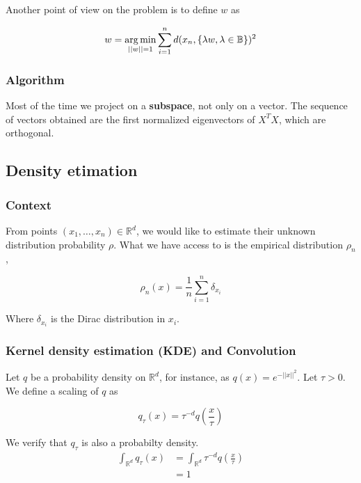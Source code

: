 \documentclass[
10pt, %
a4paper, %
oneside, %
headinclude,footinclude, %
BCOR5mm, %
]{scrartcl}
\begin{document}
Another point of view on the problem is to define $w$ as

\begin{equation*}
    w = \operatorname*{arg\,min}_{||w||=1} \sum^{n}_{i=1} d(x_n, \{\lambda w, \lambda\in \mathbb{B} \})^2
\end{equation*}

\subsubsection{\large\color{Periwinkle}Algorithm}

Most of the time we project on a \textbf{{subspace}}, not only on a vector. The sequence of vectors obtained are the first normalized eigenvectors of $X^TX$, which are orthogonal.

\subsection{\large\color{MidnightBlue}Density etimation}
\label{sec:density}

\subsubsection{\large\color{Periwinkle}Context}

From points $ (x_1, \dots, x_n)\in \mathbb{R}^d$, we would like to estimate their unknown distribution probability $\rho$. What we have access to is the empirical distribution $ \rho_n$, 

\begin{equation*}
    \rho_n(x) = \frac{1}{n} \sum^{n}_{i=1} \delta_{x_i}
\end{equation*}

Where $\delta_{x_i}$ is the Dirac distribution in $x_i$.

\subsubsection{\large\color{Periwinkle}Kernel density estimation (KDE) and Convolution}

Let $q$ be a probability density on $ \mathbb{R}^d$, for instance, as $q(x) = e^{-||x||^2}$. Let $\tau>0$. We define a scaling of $q$ as 

\begin{equation*}
    q_{\tau}(x) = \tau^{-d} q( \frac{x}{\tau} )
\end{equation*}

We verify that $q_{\tau}$ is also a probabilty density.
\begin{equation*}
    \begin{aligned}
	\int_{ \mathbb{R}^d} q_{\tau}(x)& =\int_{ \mathbb{R}^d} \tau^{-d} q( \frac{x}{\tau} )\\
	&= 1
    \end{aligned}
\end{equation*}
\end{document}
